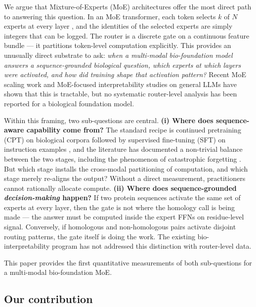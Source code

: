 \documentclass[11pt]{article}
\begin{document}
We argue that Mixture-of-Experts (MoE) architectures offer the most direct path to answering this question. In an MoE transformer, each token selects $k$ of $N$ experts at every layer \citep{shazeer2017sparse, fedus2022switch, zoph2022designing, jiang2024mixtral, vaswani2017attention}, and the identities of the selected experts are simply integers that can be logged. The router is a discrete gate on a continuous feature bundle --- it partitions token-level computation explicitly. This provides an unusually direct substrate to ask: \emph{when a multi-modal bio-foundation model answers a sequence-grounded biological question, which experts at which layers were activated, and how did training shape that activation pattern?} Recent MoE scaling work \citep{dai2024deepseekmoe, liu2024deepseekv2, wang2024loadbalance} and MoE-focused interpretability studies on general LLMs \citep{park2024moeinterpret, kanai2025moeinterp} have shown that this is tractable, but no systematic router-level analysis has been reported for a biological foundation model.

Within this framing, two sub-questions are central. \textbf{(i) Where does sequence-aware capability come from?} The standard recipe is continued pretraining (CPT) on biological corpora followed by supervised fine-tuning (SFT) on instruction examples \citep{ibrahim2024cpt, jindal2024balance, jiang2024instruction}, and the literature has documented a non-trivial balance between the two stages, including the phenomenon of catastrophic forgetting \citep{luo2023forgetting, huang2024sssr}. But which stage installs the cross-modal partitioning of computation, and which stage merely re-aligns the output? Without a direct measurement, practitioners cannot rationally allocate compute. \textbf{(ii) Where does sequence-grounded \emph{decision-making} happen?} If two protein sequences activate the same set of experts at every layer, then the gate is not where the homology call is being made --- the answer must be computed inside the expert FFNs on residue-level signal. Conversely, if homologous and non-homologous pairs activate disjoint routing patterns, the gate itself is doing the work. The existing bio-interpretability program \citep{adams2025scfminterp, templeton2024scaling, bricken2023monosemanticity, cai2024moesurvey} has not addressed this distinction with router-level data.

This paper provides the first quantitative measurements of both sub-questions for a multi-modal bio-foundation MoE.

\subsection*{Our contribution}
\end{document}
